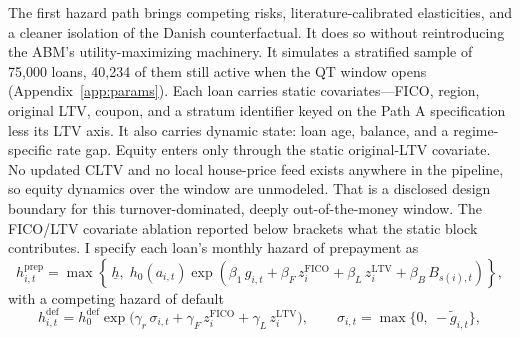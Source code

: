 \documentclass[12pt]{article}
\begin{document}
The first hazard path brings competing risks, literature-calibrated elasticities, and a cleaner isolation of the Danish counterfactual. It does so without reintroducing the ABM's utility-maximizing machinery. It simulates a stratified sample of 75,000 loans, 40,234 of them still active when the QT window opens (Appendix~\ref{app:params}). Each loan carries static covariates---FICO, region, original LTV, coupon, and a stratum identifier keyed on the Path A specification less its LTV axis. It also carries dynamic state: loan age, balance, and a regime-specific rate gap. Equity enters only through the static original-LTV covariate. No updated CLTV and no local house-price feed exists anywhere in the pipeline, so equity dynamics over the window are unmodeled. That is a disclosed design boundary for this turnover-dominated, deeply out-of-the-money window. The FICO/LTV covariate ablation reported below brackets what the static block contributes. I specify each loan's monthly hazard of prepayment as
\begin{equation}\label{eq:pathB}
h^{\mathrm{prep}}_{i,t} = \max\!\left\{\, \underline{h},\; h_0\!\left(a_{i,t}\right) \exp\!\left( \beta_1\, g_{i,t} + \beta_F\, z^{\mathrm{FICO}}_{i} + \beta_L\, z^{\mathrm{LTV}}_{i} + \beta_B\, B_{s(i),t} \right) \right\},
\end{equation}
with a competing hazard of default
\begin{equation}\label{eq:default}
h^{\mathrm{def}}_{i,t} = h^{\mathrm{def}}_0 \exp\!\big( \gamma_r\, \sigma_{i,t} + \gamma_F\, z^{\mathrm{FICO}}_{i} + \gamma_L\, z^{\mathrm{LTV}}_{i} \big), \qquad \sigma_{i,t} = \max\{0,\ -\tilde g_{i,t}\},
\end{equation}
\end{document}

